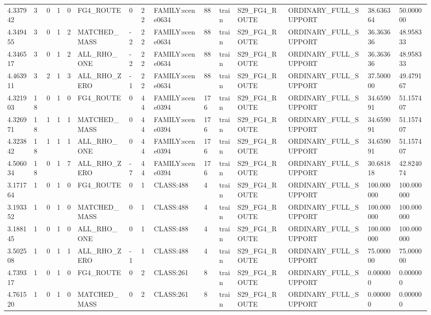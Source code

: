 \begin{tabular}{lllllllllllllll}
4.337942 & 3 & 0 & 1 & 0 & FG4\_ROUTE & 0 & 22 & FAMILY:scene0634 & 88 & train & S29\_FG4\_ROUTE & ORDINARY\_FULL\_SUPPORT & 38.636364 & 50.000000 \\
4.349455 & 3 & 0 & 1 & 2 & MATCHED\_MASS & -2 & 22 & FAMILY:scene0634 & 88 & train & S29\_FG4\_ROUTE & ORDINARY\_FULL\_SUPPORT & 36.363636 & 48.958333 \\
4.346517 & 3 & 0 & 1 & 2 & ALL\_RHO\_ONE & -2 & 22 & FAMILY:scene0634 & 88 & train & S29\_FG4\_ROUTE & ORDINARY\_FULL\_SUPPORT & 36.363636 & 48.958333 \\
4.463911 & 3 & 2 & 1 & 3 & ALL\_RHO\_ZERO & -1 & 22 & FAMILY:scene0634 & 88 & train & S29\_FG4\_ROUTE & ORDINARY\_FULL\_SUPPORT & 37.500000 & 49.479167 \\
4.321903 & 18 & 0 & 1 & 0 & FG4\_ROUTE & 0 & 44 & FAMILY:scene0394 & 176 & train & S29\_FG4\_ROUTE & ORDINARY\_FULL\_SUPPORT & 34.659091 & 51.157407 \\
4.326971 & 18 & 1 & 1 & 1 & MATCHED\_MASS & 0 & 44 & FAMILY:scene0394 & 176 & train & S29\_FG4\_ROUTE & ORDINARY\_FULL\_SUPPORT & 34.659091 & 51.157407 \\
4.323842 & 18 & 1 & 1 & 1 & ALL\_RHO\_ONE & 0 & 44 & FAMILY:scene0394 & 176 & train & S29\_FG4\_ROUTE & ORDINARY\_FULL\_SUPPORT & 34.659091 & 51.157407 \\
4.506034 & 18 & 0 & 1 & 7 & ALL\_RHO\_ZERO & -7 & 44 & FAMILY:scene0394 & 176 & train & S29\_FG4\_ROUTE & ORDINARY\_FULL\_SUPPORT & 30.681818 & 42.824074 \\
3.171764 & 1 & 0 & 1 & 0 & FG4\_ROUTE & 0 & 1 & CLASS:488 & 4 & train & S29\_FG4\_ROUTE & ORDINARY\_FULL\_SUPPORT & 100.000000 & 100.000000 \\
3.193352 & 1 & 0 & 1 & 0 & MATCHED\_MASS & 0 & 1 & CLASS:488 & 4 & train & S29\_FG4\_ROUTE & ORDINARY\_FULL\_SUPPORT & 100.000000 & 100.000000 \\
3.188145 & 1 & 0 & 1 & 0 & ALL\_RHO\_ONE & 0 & 1 & CLASS:488 & 4 & train & S29\_FG4\_ROUTE & ORDINARY\_FULL\_SUPPORT & 100.000000 & 100.000000 \\
3.502508 & 1 & 0 & 1 & 1 & ALL\_RHO\_ZERO & -1 & 1 & CLASS:488 & 4 & train & S29\_FG4\_ROUTE & ORDINARY\_FULL\_SUPPORT & 75.000000 & 75.000000 \\
4.739317 & 1 & 0 & 1 & 0 & FG4\_ROUTE & 0 & 2 & CLASS:261 & 8 & train & S29\_FG4\_ROUTE & ORDINARY\_FULL\_SUPPORT & 0.000000 & 0.000000 \\
4.761520 & 1 & 0 & 1 & 0 & MATCHED\_MASS & 0 & 2 & CLASS:261 & 8 & train & S29\_FG4\_ROUTE & ORDINARY\_FULL\_SUPPORT & 0.000000 & 0.000000 \\

\end{tabular}
